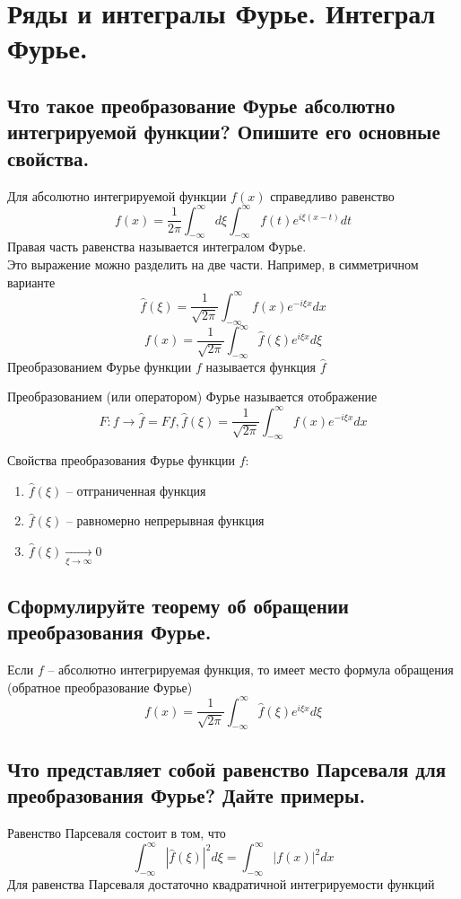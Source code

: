 \documentclass{article}
\begin{document}
\section{Ряды и интегралы Фурье. Интеграл Фурье.}

\subsection{Что такое преобразование Фурье абсолютно интегрируемой функции? Опишите его основные свойства.}

Для абсолютно интегрируемой функции $f(x)$ справедливо равенство
\[ f(x)=\frac{1}{2\pi}\int_{-\infty}^{\infty}{ d\xi \int_{-\infty}^{\infty} f(t)e^{i\xi(x-t)}dt}\]
Правая часть равенства называется интегралом Фурье.\\
Это выражение можно разделить на две части. Например, в симметричном варианте
\[ \widehat{f}(\xi) = \frac{1}{\sqrt{2\pi}}\int_{-\infty}^{\infty}f(x)e^{-i\xi x}dx  \]
\[ f(x) = \frac{1}{\sqrt{2\pi}}\int_{-\infty}^{\infty}\widehat{f}(\xi)e^{i\xi x}d\xi  \]
Преобразованием Фурье функции $f$ называется функция $\widehat{f}$

Преобразованием (или оператором) Фурье называется отображение
\[ F: f \rightarrow \widehat{f}=Ff, \widehat{f}(\xi) = \frac{1}{\sqrt{2\pi}}\int_{-\infty}^{\infty}f(x)e^{-i\xi x}dx\]

Свойства преобразования Фурье функции $f$:
\begin{enumerate}
	\item $ \widehat{f}(\xi) $ -- отграниченная функция
	\item $ \widehat{f}(\xi) $ -- равномерно непрерывная функция
	\item $ \widehat{f}(\xi) \underset{\xi\rightarrow \infty}\longrightarrow 0$
\end{enumerate}

\subsection{Сформулируйте теорему об обращении преобразования Фурье.}
Если $ f $ -- абсолютно интегрируемая функция, то имеет место формула обращения (обратное преобразование Фурье)
\[ f(x) = \frac{1}{\sqrt{2\pi}}\int_{-\infty}^{\infty}\widehat{f}(\xi)e^{i\xi x}d\xi  \]

\subsection{Что представляет собой равенство Парсеваля для преобразования Фурье? Дайте примеры.}
Равенство Парсеваля состоит в том, что 
\[ \int_{-\infty}^{\infty} \left| \widehat{f}(\xi) \right| ^2 d\xi =  \int_{-\infty}^{\infty} \left| f(x) \right| ^2 dx \]
Для равенства Парсеваля достаточно квадратичной интегрируемости функций
\end{document}
